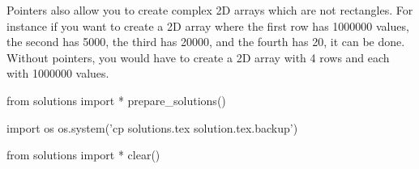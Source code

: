 Pointers also allow you to create complex 2D arrays which are not rectangles. For instance if you want to create a 2D array where the first row has 1000000 values, the second has 5000, the third has 20000, and the fourth has 20, it can be done. Without pointers, you would have to create a 2D array with 4 rows and each with 1000000 values.


















\begin{python0}
from solutions import *
prepare_solutions()
\end{python0}
\begin{python}
import os
os.system('cp solutions.tex solution.tex.backup')  
\end{python}

\begin{python0}
from solutions import *
clear()
\end{python0}
